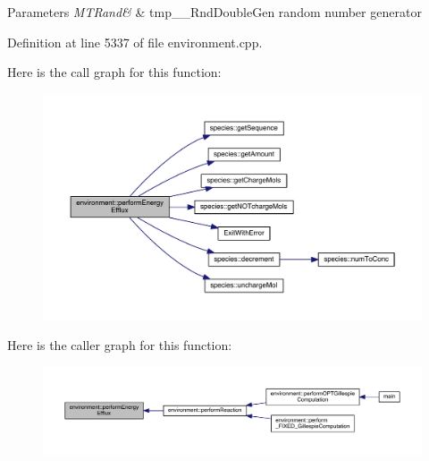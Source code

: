\begin{DoxyParams}{Parameters}
{\em M\-T\-Rand\&} & tmp\-\_\-\-\_\-\-Rnd\-Double\-Gen random number generator \\
\hline
\end{DoxyParams}


Definition at line 5337 of file environment.\-cpp.



Here is the call graph for this function\-:\nopagebreak
\begin{figure}[H]
\begin{center}
\leavevmode
\includegraphics[width=350pt]{a00014_aff7607e0f3a74790109a7d87de3031bd_cgraph}
\end{center}
\end{figure}




Here is the caller graph for this function\-:\nopagebreak
\begin{figure}[H]
\begin{center}
\leavevmode
\includegraphics[width=350pt]{a00014_aff7607e0f3a74790109a7d87de3031bd_icgraph}
\end{center}
\end{figure}


